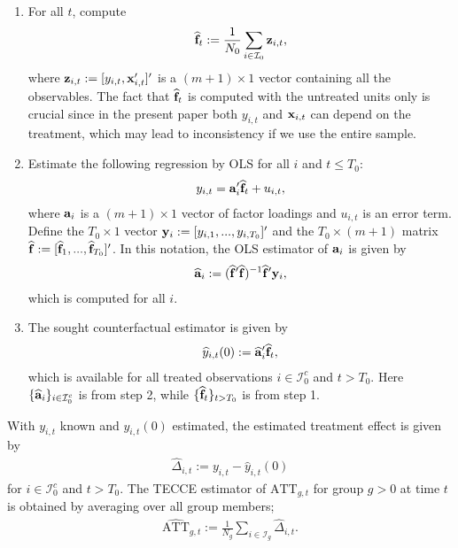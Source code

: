 \documentclass[12pt,fleqn]{article}
\begin{document}
  \begin{enumerate}
  \item For all $t$, compute
  \begin{align}
  \widehat{\mathbf{f}}_t := \frac{1}{N_0}\sum_{i \in \mathcal{I}_0} \mathbf{z}_{i,t},\label{fhat}
  \end{align}
  where $\mathbf{z}_{i,t} := [y_{i,t},\mathbf{x}_{i,t}']'$ is a $(m+1)\times 1$ vector containing all the observables. The fact that $\widehat{\mathbf{f}}_t$ is computed with the untreated units only is crucial since in the present paper both $y_{i,t}$ and $\mathbf{x}_{i,t}$ can depend on the treatment, which may lead to inconsistency if we use the entire sample.
  
  \item Estimate the following regression by OLS for all $i$ and $t \leq T_0$:
  \begin{align}
  y_{i,t} = \mathbf{a}_i'\widehat{\mathbf{f}}_t + u_{i,t}, \label{preregr}
  \end{align}
  where $\mathbf{a}_i$ is a $(m+1)\times 1$ vector of factor loadings and $u_{i,t}$ is an error term. Define the $T_0\times 1$ vector $\mathbf{y}_{i} := [y_{i,1},...,y_{i,T_0}]'$ and the $T_0\times (m+1)$ matrix $\widehat{\mathbf{f}} := [\widehat{\mathbf{f}}_{1},...,\widehat{\mathbf{f}}_{T_0}]'$. In this notation, the OLS estimator of $\mathbf{a}_i$ is given by
  \begin{align}
  \widehat{\mathbf{a}}_i := (\widehat{\mathbf{f}}'\widehat{\mathbf{f}})^{-1}\widehat{\mathbf{f}}'\mathbf{y}_{i},
  \end{align}
  which is computed for all $i$.
  
  \item The sought counterfactual estimator is given by
  \begin{align}
  \widehat y_{i,t}(0) := \widehat{\mathbf{a}}_i'\widehat{\mathbf{f}}_t,
  \end{align}
  which is available for all treated observations $i\in \mathcal{I}_0^c$ and $t > T_0$. Here $\{\widehat{\mathbf{a}}_i\}_{i\in \mathcal{I}_0^c}$ is from step 2, while $\{\widehat{\mathbf{f}}_t\}_{t > T_0}$ is from step 1.
  \end{enumerate}
  
  With $y_{i,t}$ known and $y_{i,t}(0)$ estimated, the estimated treatment effect is given by
  \begin{align}
  \widehat \Delta_{i,t} := y_{i,t} - \widehat y_{i,t}(0)  \label{theat}
  \end{align}
  for $i \in \mathcal{I}_0^c$ and $t > T_0$. The TECCE estimator of $\mathrm{ATT}_{g,t}$ for group $g>0$ at time $t$ is obtained by averaging over all group members;
  \begin{align}
  \widehat{\mathrm{ATT}}_{g,t} := \frac{1}{N_g}\sum_{i \in \mathcal{I}_g} \widehat \Delta_{i,t}. \label{atthat}
  \end{align}
  
\end{document}
